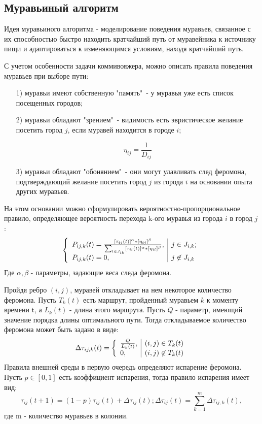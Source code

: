 \documentclass[14pt, a4paper]{extarticle}
\begin{document}
\subsection{Муравьиный алгоритм}
Идея муравьиного алгоритма - моделирование поведения муравьев, связанное с их способностью быстро находить кратчайший путь от муравейника к источнику пищи и адаптироваться к изменяющимся условиям, находя кратчайший путь.\par
С учетом особенности задачи коммивояжера, можно описать правила поведения муравьев при выборе пути:
\begin{enumerate}
	\item[1)] муравьи имеют собственную "память"\ - у муравья уже есть список посещенных городов;
	\item[2)] муравьи обладают "зрением"\ - видимость есть эвристическое желание посетить город $j$, если муравей находится в городе $i$;\par
	\begin{equation*}
		\eta_{ij} = \frac{1}{D_{ij}}
	\end{equation*}
	\item[3)] муравьи обладают "обонянием"\ - они могут улавливать след феромона, подтверждающий желание посетить город $j$ из города $i$ на основании опыта других муравьев.
\end{enumerate}
На этом основании можно сформулировать вероятностно-пропорциональное правило, определяющее вероятность перехода k-ого муравья из города $i$ в город $j$:
\begin{equation*}
	\left\{ \begin{array}{l | l}
		P_{ij,k}(t)=\frac{[\tau_{ij}(t)]^\alpha*[\eta_{ij}]^\beta}{\sum_{l\in J_{ik}}[\tau_{il}(t)]^\alpha * [\eta_{il}]^\beta}, & j \in J_{i,k};\\
		P_{ij,k}(t) = 0, & j \not\in J_{i,k}
	\end{array} \right.
\end{equation*}
Где $\alpha,\beta$ - параметры, задающие веса следа феромона.\par
Пройдя ребро $(i,j)$, муравей откладывает на нем некоторое количество феромона. Пусть $T_k(t)$ есть маршрут, пройденный муравьем $k$ к моменту времени t, а $L_k(t)$ - длина этого маршрута. Пусть $Q$ - параметр, имеющий значение порядка длины оптимального пути. Тогда откладываемое количество феромона может быть задано в виде:
\begin{equation*}
	\Delta\tau_{ij,k}(t) = \left\{ \begin{array}{l | l}
		\frac{Q}{L_k(t)}, & (i,j)\in T_k(t)\\
		0, & (i,j)\not\in T_k(t)
	\end{array} \right.
\end{equation*}
Правила внешней среды в первую очередь определяют испарение феромона. Пусть $p\in [0,1]$ есть коэффициент испарения, тогда правило испарения имеет вид:
\begin{equation*}
	\tau_{ij}(t+1) = (1-p)\tau_{ij}(t)+\Delta\tau_{ij}(t); \Delta\tau_{ij}(t) = \sum_{k=1}^{m}\Delta\tau_{ij,k}(t),
\end{equation*}
где m - количество муравьев в колонии.
\end{document}
